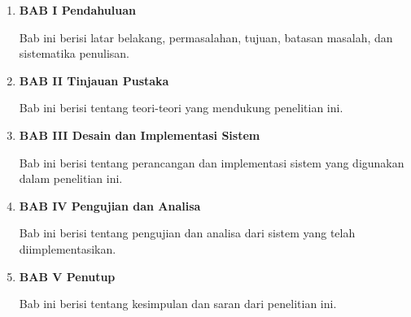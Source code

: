 \begin{enumerate}[nolistsep]

  \item \textbf{BAB I Pendahuluan}

        Bab ini berisi latar belakang, permasalahan, tujuan, batasan masalah, dan sistematika penulisan.

        \vspace{2ex}

  \item \textbf{BAB II Tinjauan Pustaka}

        Bab ini berisi tentang teori-teori yang mendukung penelitian ini.

        \vspace{2ex}

  \item \textbf{BAB III Desain dan Implementasi Sistem}

        Bab ini berisi tentang perancangan dan implementasi sistem yang digunakan dalam penelitian ini.

        \vspace{2ex}

  \item \textbf{BAB IV Pengujian dan Analisa}

        Bab ini berisi tentang pengujian dan analisa dari sistem yang telah diimplementasikan.

        \vspace{2ex}

  \item \textbf{BAB V Penutup}

        Bab ini berisi tentang kesimpulan dan saran dari penelitian ini.

\end{enumerate}
